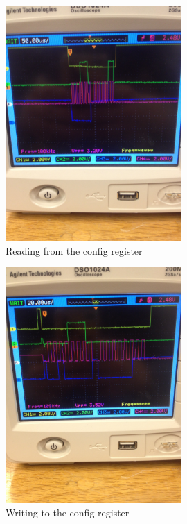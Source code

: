 \documentclass{article}
\begin{document}
\begin{figure}[H]
    \centering
    \includegraphics[width=0.6\textwidth,angle=-90]{config_read.jpg}
    \caption{Reading from the config register}
\end{figure}

\begin{figure}[H]
    \centering
    \includegraphics[width=0.6\textwidth,angle=-90]{config_write.jpg}
    \caption{Writing to the config register}
\end{figure}
\end{document}
